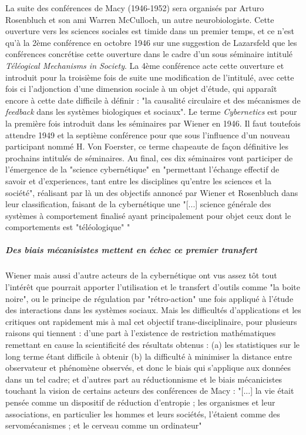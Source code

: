 {La suite des conférences de Macy (1946-1952) sera organisés par Arturo Rosenbluch et son ami Warren McCulloch, un autre neurobiologiste. Cette ouverture vers les sciences sociales est timide dans un premier temps, et ce n'est qu'à la 2ème conférence en octobre 1946 sur une suggestion de Lazarsfeld que les conférences concrétise cette ouverture dans le cadre d'un sous séminaire intitulé \textit{Téléogical Mechanisms in Society}. La 4ème conférence acte cette ouverture et introduit pour la troisième fois de suite une modification de l'intitulé, avec cette fois ci l'adjonction d'une dimension sociale à un objet d'étude, qui apparaît encore à cette date difficile à définir : "la causalité circulaire et des mécanismes de \textit{feedback} dans les systèmes biologiques et sociaux". Le terme \textit{Cybernetics} est pour la première fois introduit dans les séminaires par Wiener en 1946. Il faut toutefois attendre 1949 et la septième conférence pour que sous l'influence d'un nouveau participant nommé H. Von Foerster, ce terme chapeaute de façon définitive les prochains intitulés de séminaires. Au final, ces dix séminaires vont participer de l'émergence de la "science cybernétique" en "permettant l'échange effectif de savoir et d'experiences, tant entre les disciplines qu'entre les sciences et la société", réalisant par là un des objectifs annoncé par Wiener et Rosenbluch dans leur classification, faisant de la cybernétique une "[...] science générale des systèmes à comportement finalisé ayant principalement pour objet ceux dont le comportements est "téléologique" " \autocite{Pouvreau2013}

\subparagraph{Des biais mécanisistes mettent en échec ce premier transfert}

Wiener mais aussi d'autre acteurs de la cybernétique ont vus assez tôt tout l'intérêt que pourrait apporter l'utilisation et le transfert d'outils comme "la boite noire", ou le principe de régulation par "rétro-action" une fois appliqué à l'étude des interactions dans les systèmes sociaux. Mais les difficultés d'applications et les critiques ont rapidement mis à mal cet objectif trans-disciplinaire, pour plusieurs raisons qui tiennent : d'une part à l'existence de restriction mathématiques remettant en cause la scientificité des résultats obtenus : (a) les statistiques sur le long terme étant difficile à obtenir (b) la difficulté à minimiser la distance entre observateur et phénomène observés, et donc le biais qui s'applique aux données dans un tel cadre; et d'autres part au réductionnisme et le biais mécanicistes touchant la vision de certains acteurs des conférences de Macy  : "[...] la vie était pensée comme un dispositif de réduction d'entropie ; les organismes et leur associations, en particulier les hommes et leurs sociétés, l'étaient comme des servomécanismes ; et le cerveau comme un ordinateur" \autocite[784]{Pouvreau2013}

}
